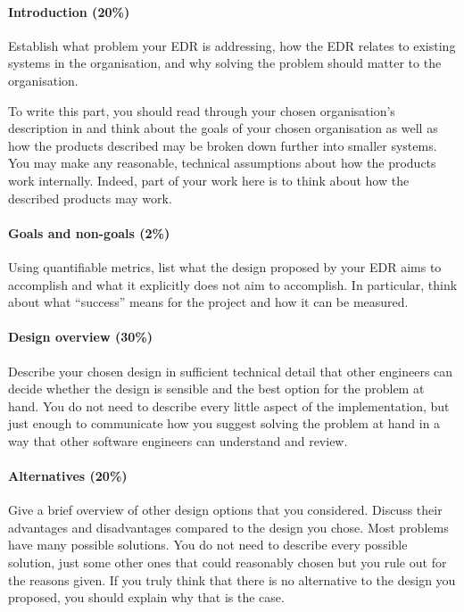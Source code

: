 \paragraph{Introduction (20\%)} Establish what problem your EDR is addressing, how the EDR relates to existing systems in the organisation, and why solving the problem should matter to the organisation.

To write this part, you should read through your chosen organisation's description in  and think about the goals of your chosen organisation as well as how the products described may be broken down further into smaller systems. You may make any reasonable, technical assumptions about how the products work internally. Indeed, part of your work here is to think about how the described products may work.

\paragraph{Goals and non-goals (2\%)} Using quantifiable metrics, list what the design proposed by your EDR aims to accomplish and what it explicitly does not aim to accomplish. In particular, think about what ``success'' means for the project and how it can be measured.

\paragraph{Design overview (30\%)} Describe your chosen design in sufficient technical detail that other engineers can decide whether the design is sensible and the best option for the problem at hand. You do not need to describe every little aspect of the implementation, but just enough to communicate how you suggest solving the problem at hand in a way that other software engineers can understand and review.

\paragraph{Alternatives (20\%)} Give a brief overview of other design options that you considered. Discuss their advantages and disadvantages compared to the design you chose. Most problems have many possible solutions. You do not need to describe every possible solution, just some other ones that could reasonably chosen but you rule out for the reasons given. If you truly think that there is no alternative to the design you proposed, you should explain why that is the case.

